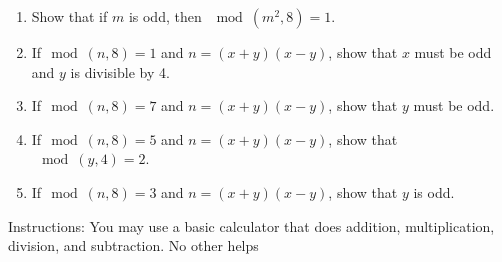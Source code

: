 \begin{enumerate}[(1)]
\item
Show that if $m$ is odd, then $\mod(m^2,8) = 1$.
\item
If$\mod(n,8)=1$ and $n = (x+y)(x-y)$, show that  $x$ must be odd and $y$ is divisible by 4.
\item
If$\mod(n,8)=7$ and $n = (x+y)(x-y)$, show that  $y$ must be odd.
\item
If$\mod(n,8)=5$ and $n = (x+y)(x-y)$, show that  $\mod(y,4) = 2$.
\item
If$\mod(n,8)=3$ and $n = (x+y)(x-y)$, show that  $y$ is odd.
\end{enumerate}

Instructions:  You may use a basic calculator that does addition, multiplication, division, and subtraction. No other helps
\bigskip

